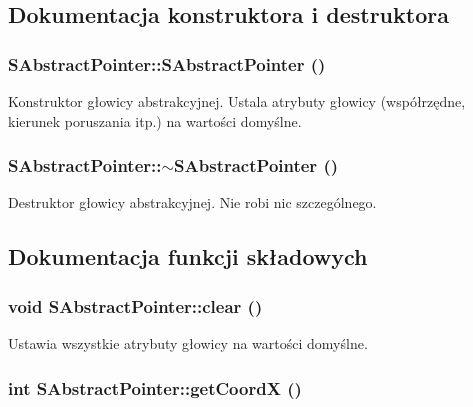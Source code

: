 \subsection{Dokumentacja konstruktora i destruktora}
\hypertarget{classSAbstractPointer_9281c3dba0da68460fa87bd17bd768b4}{
\subsubsection[{SAbstractPointer}]{\setlength{\rightskip}{0pt plus 5cm}SAbstractPointer::SAbstractPointer ()}}
\label{classSAbstractPointer_9281c3dba0da68460fa87bd17bd768b4}


Konstruktor głowicy abstrakcyjnej. Ustala atrybuty głowicy (współrzędne, kierunek poruszania itp.) na wartości domyślne. \hypertarget{classSAbstractPointer_9973354ecf610b3d48170dd70f0b22ce}{
\subsubsection[{$\sim$SAbstractPointer}]{\setlength{\rightskip}{0pt plus 5cm}SAbstractPointer::$\sim$SAbstractPointer ()}}
\label{classSAbstractPointer_9973354ecf610b3d48170dd70f0b22ce}


Destruktor głowicy abstrakcyjnej. Nie robi nic szczególnego. 

\subsection{Dokumentacja funkcji składowych}
\hypertarget{classSAbstractPointer_bb15625597bfe9f3927cdc360214bc55}{
\subsubsection[{clear}]{\setlength{\rightskip}{0pt plus 5cm}void SAbstractPointer::clear ()}}
\label{classSAbstractPointer_bb15625597bfe9f3927cdc360214bc55}


Ustawia wszystkie atrybuty głowicy na wartości domyślne. \hypertarget{classSAbstractPointer_0e44b215ff78c8315a4fc4dc12cd4049}{
\subsubsection[{getCoordX}]{\setlength{\rightskip}{0pt plus 5cm}int SAbstractPointer::getCoordX ()}}
\label{classSAbstractPointer_0e44b215ff78c8315a4fc4dc12cd4049}


